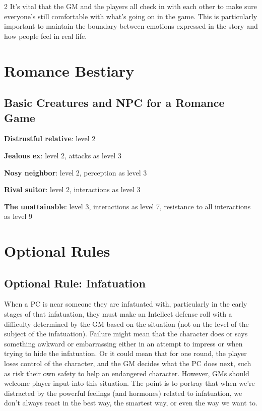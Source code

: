 \begin{multicols}{2}
It’s vital that the GM and the players all check in with each other to make sure everyone’s still comfortable with what’s going on in the game. This is particularly important to maintain the boundary between emotions expressed in the story and how people feel in real life.

\chapter{Romance Bestiary}

\section{Basic Creatures and NPC for a Romance Game}

\textbf{Distrustful relative}: level 2

\textbf{Jealous ex}: level 2, attacks as level 3

\textbf{Nosy neighbor}: level 2, perception as level 3

\textbf{Rival suitor}: level 2, interactions as level 3

\textbf{The unattainable}: level 3, interactions as level 7, resistance to all interactions as level 9

\chapter{Optional Rules}

\section{Optional Rule: Infatuation}

When a PC is near someone they are infatuated with, particularly in the early stages of that infatuation, they must make an Intellect defense roll with a difficulty determined by the GM based on the situation (not on the level of the subject of the infatuation). Failure might mean that the character does or says something awkward or embarrassing either in an attempt to impress or when trying to hide the infatuation. Or it could mean that for one round, the player loses control of the character, and the GM decides what the PC does next, such as risk their own safety to help an endangered character. However, GMs should welcome player input into this situation. The point is to portray that when we’re distracted by the powerful feelings (and hormones) related to infatuation, we don’t always react in the best way, the smartest way, or even the way we want to.


\end{multicols}
